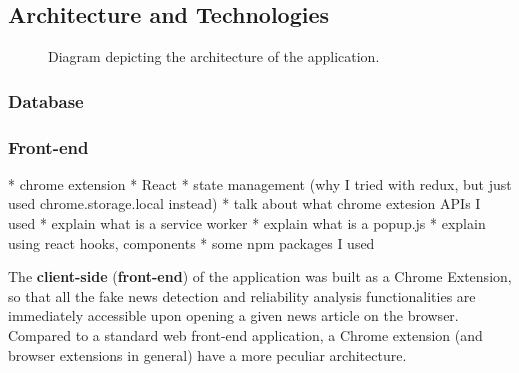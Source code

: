 \subsection{Architecture and Technologies}

\begin{figure}[h]
  \centering
  \caption{Diagram depicting the architecture of the application.}
  \label{fig:mesh1}
\end{figure}



\subsubsection{Database}

  
\subsubsection{Front-end}
  * chrome extension
  * React
  * state management (why I tried with redux, but just used chrome.storage.local instead)
  * talk about what chrome extesion APIs I used
  * explain what is a service worker
  * explain what is a popup.js
  * explain using react hooks, components
  * some npm packages I used

  The \textbf{client-side} (\textbf{front-end}) of the application was built as a Chrome Extension, so that all the fake news detection and reliability analysis functionalities are immediately accessible upon opening a given news article on the browser. Compared to a standard web front-end application, a Chrome extension (and browser extensions in general) have a more peculiar architecture. 

